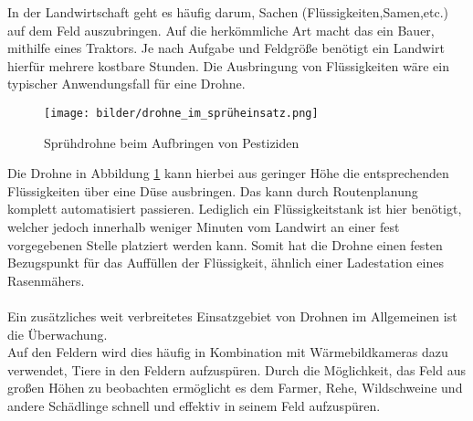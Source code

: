 In der Landwirtschaft geht es häufig darum, Sachen (Flüssigkeiten,Samen,etc.) auf dem Feld auszubringen. Auf die herkömmliche Art macht das ein Bauer, mithilfe eines Traktors.
Je nach Aufgabe und Feldgröße benötigt ein Landwirt hierfür mehrere kostbare Stunden. Die Ausbringung von Flüssigkeiten wäre ein typischer Anwendungsfall für eine Drohne.

\begin{figure}[ht]
	\centering
	\texttt{[image: bilder/drohne\_im\_sprüheinsatz.png]}
	\caption[Sprühdrohne]{Sprühdrohne beim Aufbringen von Pestiziden}
	\label{fig:sprühdrohne}
\end{figure}

Die Drohne in Abbildung \ref{fig:sprühdrohne} kann hierbei aus geringer Höhe die entsprechenden Flüssigkeiten über eine Düse ausbringen.
Das kann durch Routenplanung komplett automatisiert passieren. 
Lediglich ein Flüssigkeitstank ist hier benötigt, welcher jedoch innerhalb weniger Minuten vom Landwirt an einer fest vorgegebenen Stelle platziert werden kann.
Somit hat die Drohne einen festen Bezugspunkt für das Auffüllen der Flüssigkeit, ähnlich einer Ladestation eines Rasenmähers.
\\
\\Ein zusätzliches weit verbreitetes Einsatzgebiet von Drohnen im Allgemeinen ist die Überwachung.
\\Auf den Feldern wird dies häufig in Kombination mit Wärmebildkameras dazu verwendet, Tiere in den Feldern aufzuspüren.
Durch die Möglichkeit, das Feld aus großen Höhen zu beobachten ermöglicht es dem Farmer, Rehe, Wildschweine und andere Schädlinge schnell und effektiv in seinem Feld aufzuspüren.
